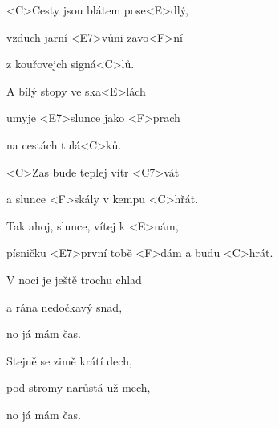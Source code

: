 
\zs
<C>Cesty jsou blátem pose<E>dlý,

vzduch jarní <E7>vůni zavo<F>ní

z kouřovejch signá<C>lů.

A bílý stopy ve ska<E>lách

umyje <E7>slunce jako <F>prach

na cestách tulá<C>ků.
\ks

\zr
<C>Zas bude teplej vítr <C7>vát

a slunce <F>skály v kempu <C>hřát.

Tak ahoj, slunce, vítej k <E>nám,

písničku <E7>první tobě <F>dám a budu <C>hrát.
\kr



\zs
V noci je ještě trochu chlad

a rána nedočkavý snad,

no já mám čas.

Stejně se zimě krátí dech,

pod stromy narůstá už mech,

no já mám čas.
\ks

\zr \kr
\zr \kr

\kp







